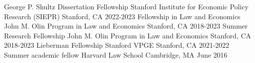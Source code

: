 


\begin{cvhonors}

  \cvhonor
    {George P. Shultz Dissertation Fellowship} %
    {Stanford Institute for Economic Policy Research (SIEPR)} %
    {Stanford, CA} %
    {2022-2023} %
  \cvhonor
    {Fellowship in Law and Economics} %
    {John M. Olin Program in Law and Economics } %
    {Stanford, CA} %
    {2018-2023} %
  \cvhonor
    {Summer Research Fellowship} %
    {John M. Olin Program in Law and Economics } %
    {Stanford, CA} %
    {2018-2023} %
  \cvhonor
    {Lieberman Fellowship} %
    {Stanford VPGE} %
    {Stanford, CA} %
    {2021-2022} %
  \cvhonor
    {Summer academic fellow} %
    {Harvard Law School} %
    {Cambridge, MA} %
    {June 2016} %

\end{cvhonors}